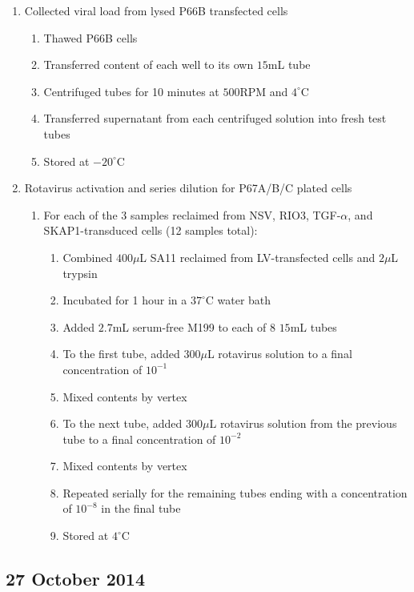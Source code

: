 \begin{enumerate}
	\item Collected viral load from lysed P66B transfected cells
		\begin{enumerate}
			\item Thawed P66B cells
			\item Transferred content of each well to its own $15$mL tube
			\item Centrifuged tubes for 10 minutes at $500$RPM and $4^{\circ}$C
			\item Transferred supernatant from each centrifuged solution into fresh test tubes
			\item Stored at $-20^{\circ}$C
		\end{enumerate}
	\item Rotavirus activation and series dilution for P67A/B/C plated cells
		\begin{enumerate}
			\item For each of the 3 samples reclaimed from NSV, RIO3, TGF-$\alpha$, and SKAP1-transduced cells (12 samples total):
				\begin{enumerate}
					\item Combined $400\mu$L SA11 reclaimed from LV-transfected cells and $2\mu$L trypsin
					\item Incubated for 1 hour in a $37^{\circ}$C water bath
					\item Added $2.7$mL serum-free M199 to each of 8 $15$mL tubes
					\item To the first tube, added $300\mu$L rotavirus solution to a final concentration of $10^{-1}$
					\item Mixed contents by vertex
					\item To the next tube, added $300\mu$L rotavirus solution from the previous tube to a final concentration of $10^{-2}$
					\item Mixed contents by vertex
					\item Repeated serially for the remaining tubes ending with a concentration of $10^{-8}$ in the final tube
					\item Stored at $4^{\circ}$C
				\end{enumerate}
		\end{enumerate}
\end{enumerate}

\subsection*{27 October 2014}

